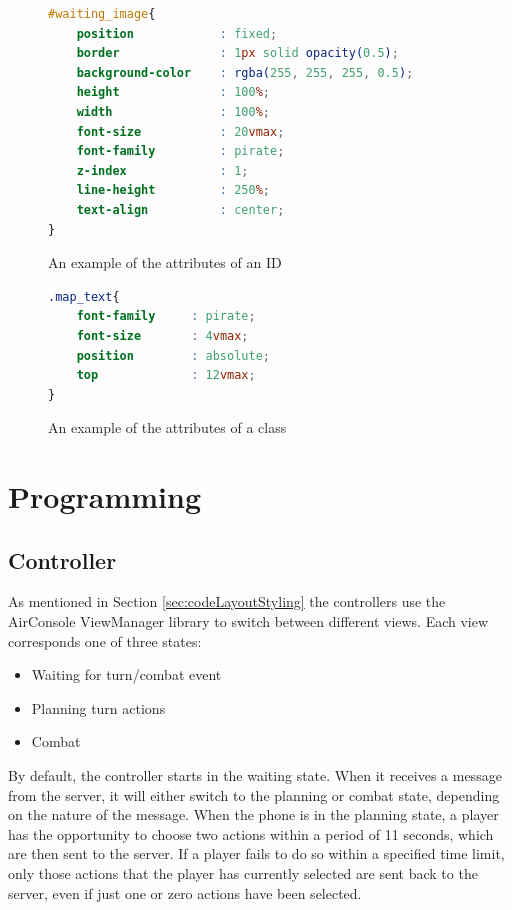 \begin{figure}
\begin{lstlisting}[language=CSS]
#waiting_image{
	position            : fixed;
	border              : 1px solid opacity(0.5);
	background-color    : rgba(255, 255, 255, 0.5);
	height              : 100%;
	width               : 100%;
	font-size           : 20vmax;
	font-family         : pirate;
	z-index             : 1;
	line-height         : 250%;
	text-align          : center;
}
\end{lstlisting} 
\caption{An example of the attributes of an ID \label{fig:IDex}}
\end{figure}

\begin{figure}
\begin{lstlisting}[language=CSS]
.map_text{
	font-family     : pirate;
	font-size       : 4vmax;
	position        : absolute;
	top	            : 12vmax;
}
\end{lstlisting} 
\caption{An example of the attributes of a class \label{fig:Classex}}
\end{figure}

\section{Programming}\label{sec:codeProgramming}

\subsection{Controller}
As mentioned in Section \ref{sec:codeLayoutStyling} the controllers use the AirConsole ViewManager library to switch between different views. Each view corresponds one of three states:
\begin{itemize}
	\item Waiting for turn/combat event
	\item Planning turn actions
	\item Combat
\end{itemize}

By default, the controller starts in the waiting state. When it receives a message from the server, it will either switch to the planning or combat state, depending on the nature of the message. When the phone is in the planning state, a player has the opportunity to choose two actions within a period of 11 seconds, which are then sent to the server. If a player fails to do so within a specified time limit, only those actions that the player has currently selected are sent back to the server, even if just one or zero actions have been selected.

